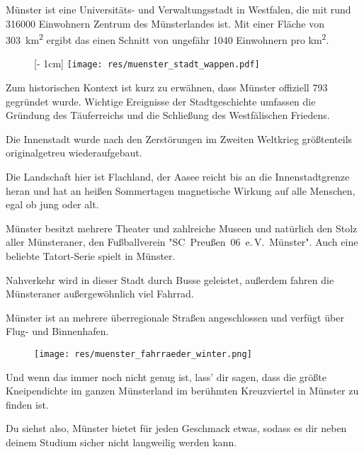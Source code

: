\begin{multicols}{2}
Münster ist eine Universitäts- und Verwaltungsstadt in Westfalen, die mit rund \num{316000} Einwohnern Zentrum des Münsterlandes ist.
Mit einer Fläche von \SI{303}{\km\squared} ergibt das einen Schnitt von ungefähr \num{1040} Einwohnern pro \si{\km\squared}.

\setlength{\intextsep}{0cm}
{%
\setlength{\columnsep}{2mm}
\begin{wrapfigure}[6]{r}[2mm]{0cm}
	\raisebox{0pt}[\dimexpr\height - 1cm\relax]{%
		\texttt{[image: res/muenster\_stadt\_wappen.pdf]}%
	}
\end{wrapfigure}
Zum historischen Kontext ist kurz zu erwähnen, dass Münster offiziell 793 gegründet wurde.
Wichtige Ereignisse der Stadtgeschichte umfassen die Gründung des Täuferreichs und die Schließung des Westfälischen Friedens.\par}

Die Innenstadt wurde nach den Zerstörungen im Zweiten Weltkrieg größtenteils originalgetreu wiederaufgebaut.

Die Landschaft hier ist Flachland, der Aasee reicht bis an die Innenstadtgrenze heran und hat an heißen Sommertagen magnetische Wirkung auf alle Menschen, egal ob jung oder alt.

Münster besitzt mehrere Theater und zahlreiche  Museen und natürlich den Stolz aller Münsteraner, den Fußballverein "SC~Preußen~06~e.\,V.~Münster".
Auch eine beliebte Tatort-Serie spielt in Münster.

Nahverkehr wird in dieser Stadt durch Busse geleistet, außerdem fahren die Münsteraner außergewöhnlich viel Fahrrad.

Münster ist an mehrere überregionale Straßen angeschlossen und verfügt über Flug- und Binnenhafen.

\setlength{\columnsep}{2mm}
\begin{wrapfigure}[8]{l}[1mm]{0cm}
	\texttt{[image: res/muenster\_fahrraeder\_winter.png]}
\end{wrapfigure}
Und wenn das immer noch nicht genug ist, lass' dir sagen, dass die größte Kneipendichte im ganzen Münsterland im berühmten Kreuzviertel in Münster zu finden ist.

Du siehst also, Münster bietet für jeden Geschmack etwas, sodass es dir neben deinem Studium sicher nicht langweilig werden kann.

\begin{center}
	\large{}
\end{center}

\end{multicols}
